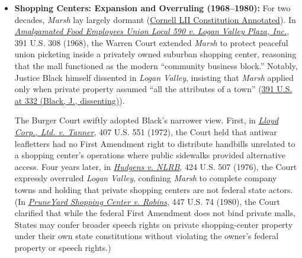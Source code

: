 \documentclass[12pt]{article}
\begin{document}
\begin{itemize}

\item \textbf{Shopping Centers: Expansion and Overruling (1968--1980):} For two decades, \textit{Marsh} lay largely dormant (\href{https://www.law.cornell.edu/constitution-conan/amendment-1/government-owned-property-early-doctrine}{Cornell LII Constitution Annotated}). In \href{https://supreme.justia.com/cases/federal/us/391/308/}{\textit{Amalgamated Food Employees Union Local 590 v. Logan Valley Plaza, Inc.}}, 391 U.S. 308 (1968), the Warren Court extended \textit{Marsh} to protect peaceful union picketing inside a privately owned suburban shopping center, reasoning that the mall functioned as the modern ``community business block.'' Notably, Justice Black himself dissented in \textit{Logan Valley}, insisting that \textit{Marsh} applied only when private property assumed ``all the attributes of a town'' (\href{https://supreme.justia.com/cases/federal/us/391/308/}{391 U.S. at 332 (Black, J., dissenting)}).

The Burger Court swiftly adopted Black's narrower view. First, in \href{https://supreme.justia.com/cases/federal/us/407/551/}{\textit{Lloyd Corp., Ltd. v. Tanner}}, 407 U.S. 551 (1972), the Court held that antiwar leafletters had no First Amendment right to distribute handbills unrelated to a shopping center's operations where public sidewalks provided alternative access. Four years later, in \href{https://supreme.justia.com/cases/federal/us/424/507/}{\textit{Hudgens v. NLRB}}, 424 U.S. 507 (1976), the Court expressly overruled \textit{Logan Valley}, confining \textit{Marsh} to complete company towns and holding that private shopping centers are not federal state actors. (In \href{https://supreme.justia.com/cases/federal/us/447/74/}{\textit{PruneYard Shopping Center v. Robins}}, 447 U.S. 74 (1980), the Court clarified that while the federal First Amendment does not bind private malls, States may confer broader speech rights on private shopping-center property under their own state constitutions without violating the owner's federal property or speech rights.)


\end{itemize}
\end{document}

